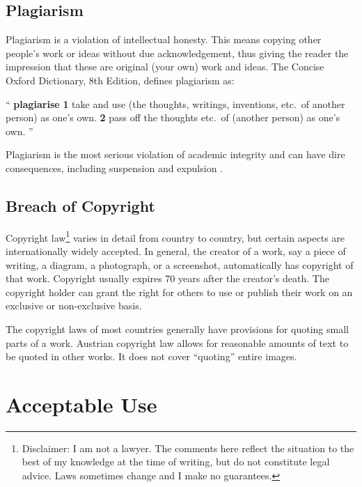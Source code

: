 \subsection{Plagiarism}

Plagiarism is a violation of intellectual honesty. This means copying
other people's work or ideas without due acknowledgement, thus giving
the reader the impression that these are original (your own) work and
ideas. The Concise Oxford Dictionary, 8th Edition, defines plagiarism
as:
\begin{displayquote}
\enquote{
\textbf{plagiarise}
\textbf{1} take and use (the thoughts, writings, inventions, etc.\ of
another person) as one's own. \textbf{2} pass off the thoughts etc.\
of (another person) as one's own.
}
\end{displayquote}
Plagiarism is the most serious violation of academic integrity and can
have dire consequences, including suspension and expulsion
\parencite{Reisman2005}.



\subsection{Breach of Copyright}

Copyright law\footnote{Disclaimer: I am not a lawyer. The comments
  here reflect the situation to the best of my knowledge at the time
  of writing, but do not constitute legal advice. Laws sometimes
  change and I make no guarantees.} varies in detail from country to
country, but certain aspects are internationally widely accepted. In
general, the creator of a work, say a piece of writing, a diagram, a
photograph, or a screenshot, automatically has copyright of that
work. Copyright usually expires 70 years after the creator's
death. The copyright holder can grant the right for others to use or
publish their work on an exclusive or non-exclusive basis.

The copyright laws of most countries generally have provisions for
quoting small parts of a work. Austrian copyright law \parencite[§
  42f]{UrhG} allows for reasonable amounts of text to be quoted in
other works. It does not cover ``quoting'' entire images.




\section{Acceptable Use}

